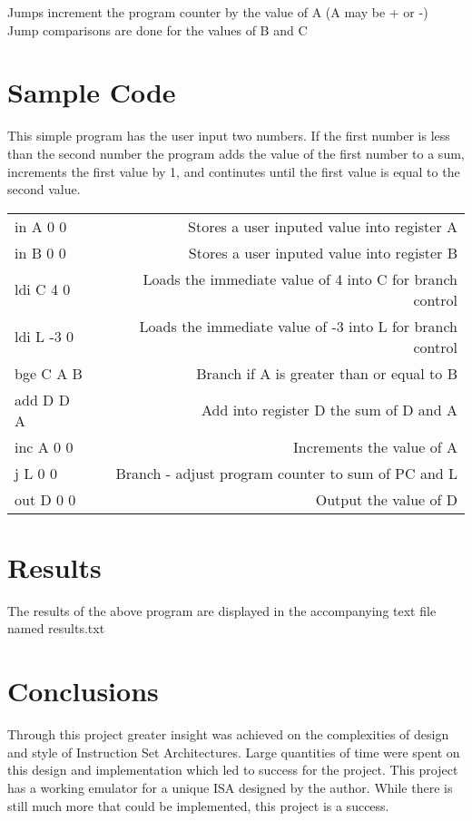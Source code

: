 \documentclass[12pt]{article}
\begin{document}
Jumps increment the program counter by the value of A (A may be + or -)\\
Jump comparisons are done for the values of B and C\\

\section{Sample Code}\label{sample code}
This simple program has the user input two numbers. If the first number is less than the second number the program adds the value of the first number 
to a sum, increments the first value by 1, and continutes until the first value is equal to the second value. \\
\begin{tabular} {l | r}
in A 0 0 & Stores a user inputed value into register A \\
in B 0 0 & Stores a user inputed value into register B \\
ldi C 4 0 & Loads the immediate value of 4 into C for branch control \\
ldi L -3 0 & Loads the immediate value of -3 into L for branch control \\
bge C A B & Branch if A is greater than or equal to B \\
add D D A & Add into register D the sum of D and A \\
inc A 0 0 & Increments the value of A \\
j L 0 0 & Branch - adjust program counter to sum of PC  and L \\
out D 0 0 & Output the value of D \\
\end{tabular}

\section{Results}\label{results}
The results of the above program are displayed in the accompanying text file named results.txt \\


\section{Conclusions}\label{conclusions}
Through this project greater insight was achieved on the complexities of design and style of Instruction Set Architectures. Large quantities of time 
were spent on this design and implementation which led to success for the project. This project has a working emulator for a unique ISA designed by 
the author. While there is still much more that could be implemented, this project is a success. 
\end{document}
